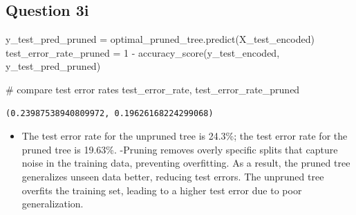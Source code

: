\documentclass[
  letterpaper,
  DIV=11,
  numbers=noendperiod]{scrartcl}
\newenvironment{Shaded}{\begin{snugshade}}{\end{snugshade}}
\newcommand{\CommentTok}[1]{\textcolor[rgb]{0.37,0.37,0.37}{#1}}
\newcommand{\DecValTok}[1]{\textcolor[rgb]{0.68,0.00,0.00}{#1}}
\newcommand{\NormalTok}[1]{\textcolor[rgb]{0.00,0.23,0.31}{#1}}
\newcommand{\OperatorTok}[1]{\textcolor[rgb]{0.37,0.37,0.37}{#1}}
\providecommand{\tightlist}{%
  \setlength{\itemsep}{0pt}\setlength{\parskip}{0pt}}\usepackage{longtable,booktabs,array}
\begin{document}
\subsection{Question 3i}\label{question-3i}

\begin{Shaded}
\begin{Highlighting}[]
\NormalTok{y\_test\_pred\_pruned }\OperatorTok{=}\NormalTok{ optimal\_pruned\_tree.predict(X\_test\_encoded)}
\NormalTok{test\_error\_rate\_pruned }\OperatorTok{=} \DecValTok{1} \OperatorTok{{-}}\NormalTok{ accuracy\_score(y\_test\_encoded, y\_test\_pred\_pruned)}

\CommentTok{\# compare test error rates}
\NormalTok{test\_error\_rate, test\_error\_rate\_pruned}
\end{Highlighting}
\end{Shaded}

\begin{verbatim}
(0.23987538940809972, 0.19626168224299068)
\end{verbatim}

\begin{itemize}
\tightlist
\item
  The test error rate for the unpruned tree is 24.3\%; the test error
  rate for the pruned tree is 19.63\%. -Pruning removes overly specific
  splits that capture noise in the training data, preventing
  overfitting. As a result, the pruned tree generalizes unseen data
  better, reducing test errors. The unpruned tree overfits the training
  set, leading to a higher test error due to poor generalization.
\end{itemize}
\end{document}
